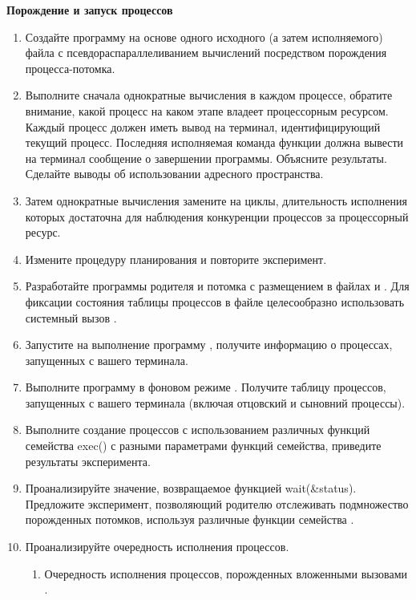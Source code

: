 \renewcommand{\labelenumii}{\theenumii}
\renewcommand{\theenumii}{\theenumi.\arabic{enumii}.}

\textbf{Порождение и запуск процессов}

\begin{enumerate}
	\item Создайте программу на основе одного исходного (а затем исполняемого) файла с псевдораспараллеливанием вычислений посредством порождения процесса-потомка.
	\item Выполните сначала однократные вычисления в каждом процессе, обратите внимание, какой процесс на каком этапе владеет процессорным ресурсом. Каждый процесс должен иметь вывод на терминал, идентифицирующий текущий процесс. Последняя исполняемая команда функции  должна вывести на терминал сообщение о завершении программы. Объясните результаты. Сделайте выводы об использовании адресного пространства.
	\item Затем однократные вычисления замените на циклы, длительность исполнения которых достаточна для наблюдения конкуренции процессов за процессорный ресурс.
	\item Измените процедуру планирования и повторите эксперимент.
	\item Разработайте программы родителя и потомка с размещением в файлах  и . Для фиксации состояния таблицы процессов в файле целесообразно использовать системный вызов .
	\item Запустите на выполнение программу , получите информацию о процессах, запущенных с вашего терминала.
	\item Выполните программу  в фоновом режиме . Получите таблицу процессов, запущенных с вашего терминала (включая отцовский и сыновний процессы).
	\item Выполните создание процессов с использованием различных функций семейства exec() с разными параметрами функций семейства, приведите результаты эксперимента.
	\item  Проанализируйте значение, возвращаемое функцией wait(\&status). Предложите эксперимент, позволяющий родителю отслеживать подмножество порожденных потомков, используя различные функции семейства .
	\item Проанализируйте очередность исполнения процессов.
		\begin{enumerate}
			\item Очередность исполнения процессов, порожденных вложенными вызовами .

\end{enumerate}
\end{enumerate}
